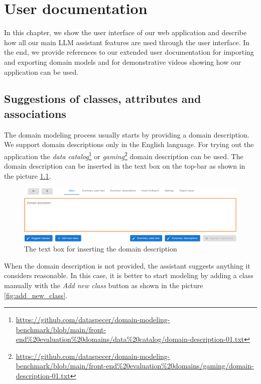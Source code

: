 \chapter{User documentation}
\label{chap:user_documentation}

In this chapter, we show the user interface of our web application and describe how all our main LLM assistant features are used through the user interface. In the end, we provide references to our extended user documentation for importing and exporting domain models and for demonstrative videos showing how our application can be used. 


\section{Suggestions of classes, attributes and associations}

The domain modeling process usually starts by providing a domain description. We support domain descriptions only in the English language. For trying out the application the \textit{data catalog}\footnote{\url{https://github.com/dataspecer/domain-modeling-benchmark/blob/main/front-end\%20evaluation\%20domains/data\%20catalog/domain-description-01.txt}} or \textit{gaming}\footnote{\url{https://github.com/dataspecer/domain-modeling-benchmark/blob/main/front-end\%20evaluation\%20domains/gaming/domain-description-01.txt}} domain description can be used. The domain description can be inserted in the text box on the top-bar as shown in the picture \ref{fig:domain-description-text-box}.

\begin{figure}[!h]
    \includegraphics[scale=0.29]{../docs/images/frontend/insert-domain-description.png}
    \caption{\centering The text box for inserting the domain description}
    \label{fig:domain-description-text-box}
\end{figure}

When the domain description is not provided, the assistant suggests anything it considers reasonable. In this case, it is better to start modeling by adding a class manually with the \textit{Add new class} button as shown in the picture \ref{fig:add_new_class}.

